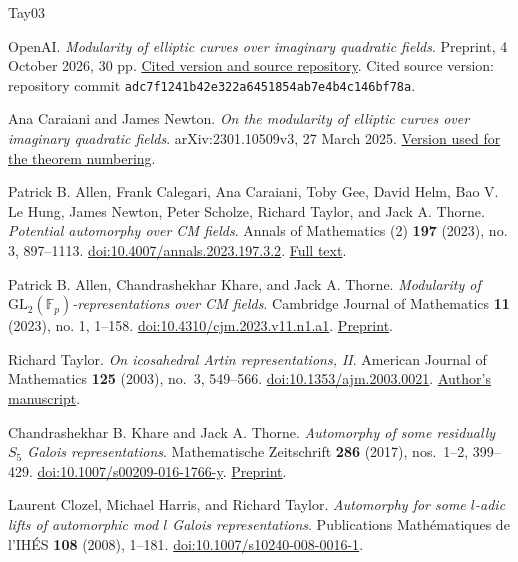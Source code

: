 \documentclass[11pt,a4paper]{article}
\numberwithin{equation}{section}
\begin{document}
\begin{thebibliography}{Tay03}

OpenAI.
\emph{Modularity of elliptic curves over imaginary quadratic fields}.
Preprint, 4 October 2026, 30 pp.
\href{https://github.com/openai/math/blob/adc7f1241b42e322a6451854ab7e4b4c146bf78a/preprints/Modularity-of-elliptic-curves-over-imaginary-quadratic-fields-October-4-2026/paper.pdf}{Cited version and source repository}.
Cited source version: repository commit {\small\texttt{adc7f1241b42e322a6451854ab7e4b4c146bf78a}}.

Ana Caraiani and James Newton.
\emph{On the modularity of elliptic curves over imaginary quadratic fields}.
arXiv:2301.10509v3, 27 March 2025.
\href{https://arxiv.org/html/2301.10509v3}{Version used for the theorem numbering}.

Patrick B. Allen, Frank Calegari, Ana Caraiani, Toby Gee, David Helm, Bao V. Le Hung, James Newton, Peter Scholze, Richard Taylor, and Jack A. Thorne.
\emph{Potential automorphy over CM fields}.
Annals of Mathematics (2) \textbf{197} (2023), no. 3, 897--1113.
\href{https://doi.org/10.4007/annals.2023.197.3.2}{doi:10.4007/annals.2023.197.3.2}.
\href{https://people.mpim-bonn.mpg.de/scholze/CMPotAut.pdf}{Full text}.

Patrick B. Allen, Chandrashekhar Khare, and Jack A. Thorne.
\emph{Modularity of \(\mathrm{GL}_2(\mathbb F_p)\)-representations over CM fields}.
Cambridge Journal of Mathematics \textbf{11} (2023), no. 1, 1--158.
\href{https://doi.org/10.4310/cjm.2023.v11.n1.a1}{doi:10.4310/cjm.2023.v11.n1.a1}.
\href{https://arxiv.org/abs/1910.12986v2}{Preprint}.

Richard Taylor.
\emph{On icosahedral Artin representations, II}.
American Journal of Mathematics \textbf{125} (2003), no.~3, 549--566.
\href{https://doi.org/10.1353/ajm.2003.0021}{doi:10.1353/ajm.2003.0021}.
\href{https://virtualmath1.stanford.edu/~rltaylor/artin2.pdf}{Author's manuscript}.

Chandrashekhar B. Khare and Jack A. Thorne.
\emph{Automorphy of some residually \(S_5\) Galois representations}.
Mathematische Zeitschrift \textbf{286} (2017), nos.~1--2, 399--429.
\href{https://doi.org/10.1007/s00209-016-1766-y}{doi:10.1007/s00209-016-1766-y}.
\href{https://arxiv.org/abs/1503.03796}{Preprint}.

Laurent Clozel, Michael Harris, and Richard Taylor.
\emph{Automorphy for some \(l\)-adic lifts of automorphic mod \(l\) Galois representations}.
Publications Mathématiques de l'IHÉS \textbf{108} (2008), 1--181.
\href{https://doi.org/10.1007/s10240-008-0016-1}{doi:10.1007/s10240-008-0016-1}.


\end{thebibliography}
\end{document}
